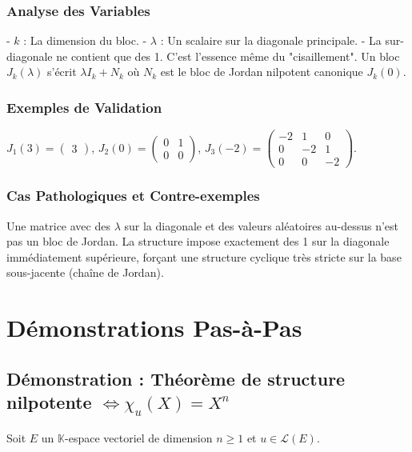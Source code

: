 \documentclass[11pt,a4paper]{article}
\begin{document}
\subsubsection{Analyse des Variables}
- $k$ : La dimension du bloc.
- $\lambda$ : Un scalaire sur la diagonale principale.
- La sur-diagonale ne contient que des 1. C'est l'essence même du "cisaillement". Un bloc $J_k(\lambda)$ s'écrit $\lambda I_k + N_k$ où $N_k$ est le bloc de Jordan nilpotent canonique $J_k(0)$.

\subsubsection{Exemples de Validation}
$J_1(3) = \begin{pmatrix} 3 \end{pmatrix}$, $J_2(0) = \begin{pmatrix} 0 & 1 \\ 0 & 0 \end{pmatrix}$, $J_3(-2) = \begin{pmatrix} -2 & 1 & 0 \\ 0 & -2 & 1 \\ 0 & 0 & -2 \end{pmatrix}$.

\subsubsection{Cas Pathologiques et Contre-exemples}
Une matrice avec des $\lambda$ sur la diagonale et des valeurs aléatoires au-dessus n'est pas un bloc de Jordan. La structure impose exactement des 1 sur la diagonale immédiatement supérieure, forçant une structure cyclique très stricte sur la base sous-jacente (chaîne de Jordan).

\section{Démonstrations Pas-à-Pas}

\subsection{Démonstration : Théorème de structure nilpotente $\iff \chi_u(X) = X^n$}

Soit $E$ un $\mathbb{K}$-espace vectoriel de dimension $n \ge 1$ et $u \in \mathcal{L}(E)$.
\end{document}
